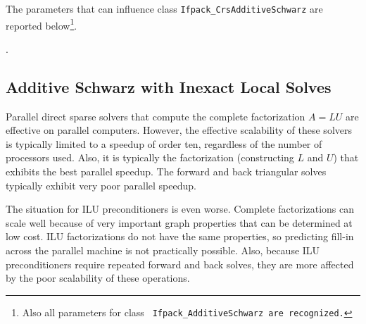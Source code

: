 The parameters that can influence class \verb!Ifpack_CrsAdditiveSchwarz! are
reported below\footnote{Also all parameters for class \tt
  Ifpack\_AdditiveSchwarz are recognized.}.

.


\subsection{Additive Schwarz with Inexact Local Solves}
\label{sec:as_ilu}

Parallel direct sparse solvers that compute the complete factorization $A=LU$
are effective on parallel computers.  However, the effective scalability
of these solvers is typically limited to a speedup of order ten, regardless
of the number of processors used.  Also, it is typically the factorization
(constructing $L$ and $U$) that exhibits the best parallel speedup.  The 
forward and back triangular solves typically exhibit very poor parallel speedup.

The situation for ILU preconditioners is even worse.  Complete factorizations
can scale well because of very important graph properties that can be determined
at low cost.  ILU factorizations do not have the same properties, so predicting
fill-in across the parallel machine is not practically possible.  Also, because ILU
preconditioners require repeated forward and back solves, they are more affected
by the poor scalability of these operations.

